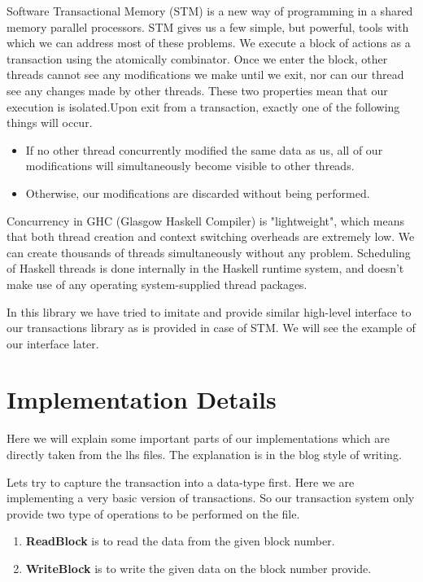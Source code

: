 \documentclass[11pt,a4paper]{article}
\begin{document}
Software Transactional Memory (STM) is a new way of programming in a shared memory parallel processors. STM gives us a few simple, but powerful, tools with which we can address most of these problems. We execute a block of actions as a transaction using the atomically combinator. Once we enter the block, other threads cannot see any modifications we make until we exit, nor can our thread see any changes made by other threads. These two properties mean that our execution is isolated.Upon exit from a transaction, exactly one of the following things will occur.
\begin{itemize}
\item If no other thread concurrently modified the same data as us, all of our modifications will simultaneously become visible to other threads.
\item Otherwise, our modifications are discarded without being performed.
\end{itemize}

Concurrency in GHC (Glasgow Haskell Compiler) is "lightweight", which means that both thread creation and context switching overheads are extremely low. We can create thousands of threads simultaneously without any problem. Scheduling of Haskell threads is done internally in the Haskell runtime system, and doesn't make use of any operating system-supplied thread packages.

In this library we have tried to imitate and provide similar high-level interface to our transactions library as is provided in case of STM. We will see the example of our interface later.

\pagebreak
\section{Implementation Details}

Here we will explain some important parts of our implementations which are directly taken from the lhs files. The explanation is in the blog style of writing.

Lets try to capture the transaction into a data-type first. Here
we are implementing a very basic version of transactions. So our
transaction system only provide two type of operations to be performed
on the file.

\begin{enumerate}
\item \textbf{ReadBlock} is to read the data from the given block number.
\item \textbf{WriteBlock} is to write the given data on the block number provide.
\end{enumerate}
\end{document}
